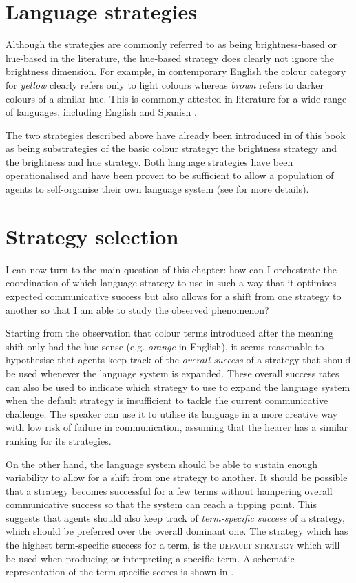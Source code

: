 \section{Language strategies}

Although the strategies are commonly referred to as
being bright\-ness-based or hue-based in the literature, the hue-based strategy does
clearly not ignore the brightness dimension. For example, in
contemporary English the colour category for \textit{yellow} clearly refers
only to light colours whereas \textit{brown} refers to darker colours of a
similar hue. This is commonly attested in literature for a wide range
of languages, including English \citep{sturges95location,
  boynton97insights} and Spanish \citep{lillo07locating}.

The two strategies described above have already been introduced in
 of this book as being substrategies
of the basic colour strategy: the brightness strategy
and the brightness and hue strategy. Both language strategies
have been operationalised and have been proven to be sufficient to
allow a population of agents to self-organise their own language
system (see  for more details).

\section{Strategy selection}

I can now turn to the main question of this chapter: how can I
orchestrate the coordination of which language strategy to use in such
a way that it optimises expected communicative success but also allows
for a shift from one strategy to another so that I am able to study
the observed phenomenon?

Starting from the observation that colour terms introduced after the
meaning shift only had the hue sense (e.g. \textit{orange} in English), it
seems reasonable to hypothesise that agents keep track of the
\emph{overall success} of a strategy that should be used whenever the
language system is expanded. These overall success rates can also be
used to indicate which strategy to use to expand the language system
when the default strategy is insufficient to tackle the current
communicative challenge. The speaker can use it to utilise its language in
a more creative way with low risk of failure in communication, assuming
that the hearer has a similar ranking for its strategies.

On the other hand, the language system should be able to sustain
enough variability to allow for a shift from one strategy to
another. It should be possible that a strategy becomes successful for
a few terms without hampering overall communicative success so that
the system can reach a tipping point. This suggests that agents should
also keep track of \emph{term-specific success} of a strategy, which
should be preferred over the overall dominant one. The strategy which
has the highest term-specific success for a term, is the \textsc{default
  strategy} which will be used when producing or interpreting a
specific term. A schematic representation of the term-specific scores
is shown in .

